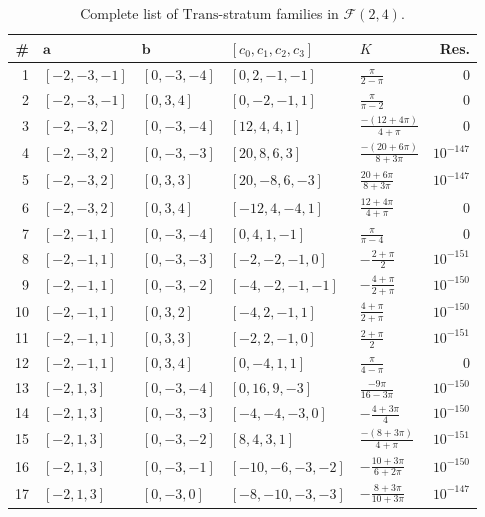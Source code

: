 \documentclass[12pt, reqno]{amsart}
\theoremstyle{definition}
\theoremstyle{remark}
\newcommand{\Trans}{\mathrm{Trans}}
\begin{document}
\begin{table}[htbp]
\centering
\caption{Complete list of $\Trans$-stratum families in $\mathcal{F}(2,4)$.}\label{tab:trans}
\smallskip
{\footnotesize\renewcommand{\arraystretch}{1.3}
\begin{tabular}{r@{\;}l@{\;}l@{\;\;}l@{\;\;}l@{\;\;}r}
\hline
\# & $\mathbf{a}$ & $\mathbf{b}$ & $[c_0,c_1,c_2,c_3]$ & $K$ & Res. \\
\hline
 1 & $[-2,-3,-1]$ & $[0,-3,-4]$ & $[0,2,-1,-1]$
   & $\frac{\pi}{2-\pi}$ & $0$ \\
 2 & $[-2,-3,-1]$ & $[0,3,4]$ & $[0,-2,-1,1]$
   & $\frac{\pi}{\pi-2}$ & $0$ \\
 3 & $[-2,-3,2]$ & $[0,-3,-4]$ & $[12,4,4,1]$
   & $\frac{-(12+4\pi)}{4+\pi}$ & $0$ \\
 4 & $[-2,-3,2]$ & $[0,-3,-3]$ & $[20,8,6,3]$
   & $\frac{-(20+6\pi)}{8+3\pi}$ & $10^{-147}$ \\
 5 & $[-2,-3,2]$ & $[0,3,3]$ & $[20,-8,6,-3]$
   & $\frac{20+6\pi}{8+3\pi}$ & $10^{-147}$ \\
 6 & $[-2,-3,2]$ & $[0,3,4]$ & $[-12,4,-4,1]$
   & $\frac{12+4\pi}{4+\pi}$ & $0$ \\
 7 & $[-2,-1,1]$ & $[0,-3,-4]$ & $[0,4,1,-1]$
   & $\frac{\pi}{\pi-4}$ & $0$ \\
 8 & $[-2,-1,1]$ & $[0,-3,-3]$ & $[-2,-2,-1,0]$
   & $-\frac{2+\pi}{2}$ & $10^{-151}$ \\
 9 & $[-2,-1,1]$ & $[0,-3,-2]$ & $[-4,-2,-1,-1]$
   & $-\frac{4+\pi}{2+\pi}$ & $10^{-150}$ \\
10 & $[-2,-1,1]$ & $[0,3,2]$ & $[-4,2,-1,1]$
   & $\frac{4+\pi}{2+\pi}$ & $10^{-150}$ \\
11 & $[-2,-1,1]$ & $[0,3,3]$ & $[-2,2,-1,0]$
   & $\frac{2+\pi}{2}$ & $10^{-151}$ \\
12 & $[-2,-1,1]$ & $[0,3,4]$ & $[0,-4,1,1]$
   & $\frac{\pi}{4-\pi}$ & $0$ \\
13 & $[-2,1,3]$ & $[0,-3,-4]$ & $[0,16,9,-3]$
   & $\frac{-9\pi}{16-3\pi}$ & $10^{-150}$ \\
14 & $[-2,1,3]$ & $[0,-3,-3]$ & $[-4,-4,-3,0]$
   & $-\frac{4+3\pi}{4}$ & $10^{-150}$ \\
15 & $[-2,1,3]$ & $[0,-3,-2]$ & $[8,4,3,1]$
   & $\frac{-(8+3\pi)}{4+\pi}$ & $10^{-151}$ \\
16 & $[-2,1,3]$ & $[0,-3,-1]$ & $[-10,-6,-3,-2]$
   & $-\frac{10+3\pi}{6+2\pi}$ & $10^{-150}$ \\
17 & $[-2,1,3]$ & $[0,-3,0]$ & $[-8,-10,-3,-3]$
   & $-\frac{8+3\pi}{10+3\pi}$ & $10^{-147}$ \\

\end{tabular}}
\end{table}
\end{document}
